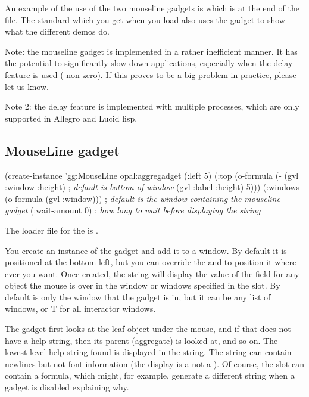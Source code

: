 An example of the use of the two mouseline gadgets is
 which is at the end of the 
file.  The standard  which you get when you load
 also uses the  gadget to
show what the different demos do.

Note: the mouseline gadget is implemented in a rather inefficient
manner.  It has the potential to significantly slow down applications,
especially when the delay feature is used ( non-zero).
If this proves to be a big problem in practice, please let us know.

Note 2: the delay feature is implemented with multiple processes, which
are only supported in Allegro and Lucid lisp.

\subsection{MouseLine gadget}

\begin{programexample}
(create-instance 'gg:MouseLine opal:aggregadget
  (:left 5)
  (:top (o-formula (- (gvl :window :height)  ; {\it default is bottom of window}
		      (gvl :label :height)
		      5)))
  (:windows (o-formula (gvl :window)))  ; {\it default is the window containing the mouseline gadget}
  (:wait-amount 0)   ; {\it how long to wait before displaying the string}
\end{programexample}

The loader file for the  is .

You create an instance of the  gadget and add it to a
window.  By default it is positioned at the bottom left, but you can
override the  and  to position it where-ever you
want.  Once created, the string will display the value of the
 field for any object the mouse is over in the window
or windows specified in the  slot.  By default
 is only the window that the  gadget is in,
but it can be any list of windows, or T for all interactor windows.

The gadget first looks at the leaf object under the mouse, and if that
does not have a help-string, then its parent (aggregate) is looked at,
and so on.   The lowest-level help string found is displayed in the
string.  The string can contain newlines but not font information (the
display is a  not a ).
Of course, the  slot can contain a formula, which
might, for example, generate a different string when a gadget is
disabled explaining why.

